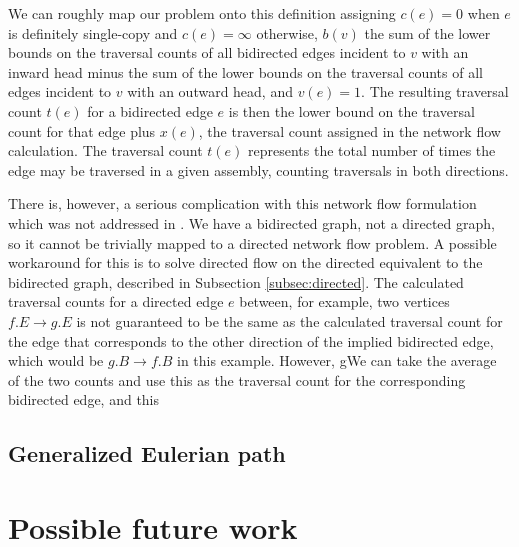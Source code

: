 \documentclass[10pt]{article}
\newcommand{\Subsection}[1]{Subsection \ref{#1}}
\begin{document}
We can roughly map our problem onto this definition assigning $c(e) = 0$ when
$e$ is definitely single-copy and $c(e) = \infty$ otherwise, $b(v)$ the sum
of the lower bounds on the traversal counts of all bidirected edges incident to
$v$ with an inward head minus the sum of the lower bounds on the traversal
counts of all edges incident to $v$ with an outward head, and $v(e) = 1$.  The
resulting traversal count $t(e)$ for a bidirected edge $e$ is then the lower
bound on the traversal count for that edge plus $x(e)$, the traversal count
assigned in the network flow calculation.  The traversal count $t(e)$ represents
the total number of times the edge may be traversed in a given assembly,
counting traversals in both directions.

There is, however, a serious complication with this network flow formulation
which was not addressed in \cite{Myers2005}.  We have a bidirected graph, not a
directed graph, so it cannot be trivially mapped to a directed network flow
problem.  A possible workaround for this is to solve directed flow on the
directed equivalent to the bidirected graph, described in
\Subsection{subsec:directed}.  The calculated traversal counts for a directed
edge $e$ between, for example, two vertices $f.E \to g.E$ is not guaranteed to
be the same as the calculated traversal count for the edge that corresponds to
the other direction of the implied bidirected edge, which would be $g.B \to f.B$
in this example.  However, gWe can take the average of the two counts and use this as the
traversal count for the corresponding bidirected edge, and this 


\subsection{Generalized Eulerian path}

\section{Possible future work}
\end{document}
